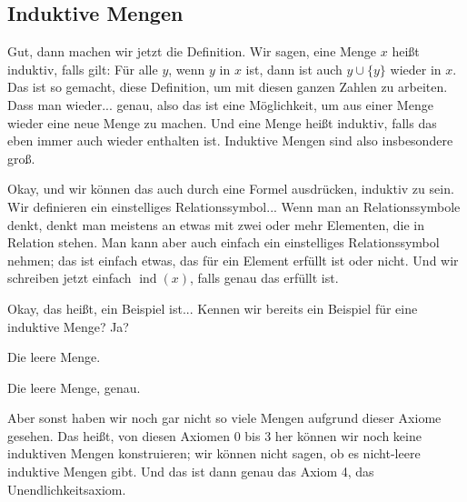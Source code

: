 \subsection{Induktive Mengen}
\begin{spoken-clean}[00:20:01 - 00:22:54]
Gut, dann machen wir jetzt die Definition. Wir sagen, eine Menge $x$ heißt induktiv, falls gilt: Für alle $y$, wenn $y$ in $x$ ist, dann ist auch $y \cup \{y\}$ wieder in $x$. Das ist so gemacht, diese Definition, um mit diesen ganzen Zahlen zu arbeiten. Dass man wieder... genau, also das ist eine Möglichkeit, um aus einer Menge wieder eine neue Menge zu machen. Und eine Menge heißt induktiv, falls das eben immer auch wieder enthalten ist. Induktive Mengen sind also insbesondere groß.

Okay, und wir können das auch durch eine Formel ausdrücken, induktiv zu sein. Wir definieren ein einstelliges Relationssymbol... Wenn man an Relationssymbole denkt, denkt man meistens an etwas mit zwei oder mehr Elementen, die in Relation stehen. Man kann aber auch einfach ein einstelliges Relationssymbol nehmen; das ist einfach etwas, das für ein Element erfüllt ist oder nicht. Und wir schreiben jetzt einfach $\operatorname{ind}(x)$, falls genau das erfüllt ist.

Okay, das heißt, ein Beispiel ist... Kennen wir bereits ein Beispiel für eine induktive Menge? Ja?
\end{spoken-clean}

\begin{student-interaction}[Studentenantwort]
Die leere Menge.
\end{student-interaction}

\begin{spoken-clean}[continued]
Die leere Menge, genau.

Aber sonst haben wir noch gar nicht so viele Mengen aufgrund dieser Axiome gesehen. Das heißt, von diesen Axiomen 0 bis 3 her können wir noch keine induktiven Mengen konstruieren; wir können nicht sagen, ob es nicht-leere induktive Mengen gibt. Und das ist dann genau das Axiom 4, das Unendlichkeitsaxiom.
\end{spoken-clean}

